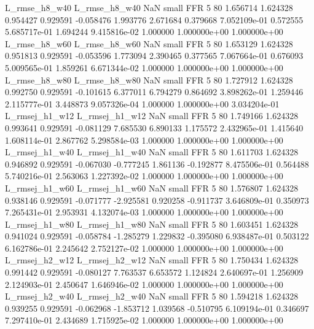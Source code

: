  L_rmse_h8_w40  L_rmse_h8_w40                   NaN      small      FFR                 5 80 1.656714       1.624328 0.954427       0.929591   -0.058476      1.993776      2.671684     0.379668   7.052109e-01  0.572555 5.685717e-01     1.694244   9.415816e-02            1.000000    1.000000e+00        1.000000e+00
 L_rmse_h8_w60  L_rmse_h8_w60                   NaN      small      FFR                 5 80 1.653129       1.624328 0.951813       0.929591   -0.053596      1.773094      2.390465     0.377565   7.067664e-01  0.676093 5.009565e-01     1.859261   6.671344e-02            1.000000    1.000000e+00        1.000000e+00
 L_rmse_h8_w80  L_rmse_h8_w80                   NaN      small      FFR                 5 80 1.727912       1.624328 0.992750       0.929591   -0.101615      6.377011      6.794279     0.864692   3.898262e-01  1.259446 2.115777e-01     3.448873   9.057326e-04            1.000000    1.000000e+00        3.034204e-01
L_rmsej_h1_w12 L_rmsej_h1_w12                   NaN      small      FFR                 5 80 1.749166       1.624328 0.993641       0.929591   -0.081129      7.685530      6.890133     1.175572   2.432965e-01  1.415640 1.608114e-01     2.867762   5.298584e-03            1.000000    1.000000e+00        1.000000e+00
L_rmsej_h1_w40 L_rmsej_h1_w40                   NaN      small      FFR                 5 80 1.611703       1.624328 0.946892       0.929591   -0.067030     -0.777245      1.861136    -0.192877   8.475506e-01  0.564488 5.740216e-01     2.563063   1.227392e-02            1.000000    1.000000e+00        1.000000e+00
L_rmsej_h1_w60 L_rmsej_h1_w60                   NaN      small      FFR                 5 80 1.576807       1.624328 0.938146       0.929591   -0.071777     -2.925581      0.920258    -0.911737   3.646809e-01  0.350973 7.265431e-01     2.953931   4.132074e-03            1.000000    1.000000e+00        1.000000e+00
L_rmsej_h1_w80 L_rmsej_h1_w80                   NaN      small      FFR                 5 80 1.603451       1.624328 0.941024       0.929591   -0.058784     -1.285279      1.229832    -0.395080   6.938487e-01  0.503122 6.162786e-01     2.245642   2.752127e-02            1.000000    1.000000e+00        1.000000e+00
L_rmsej_h2_w12 L_rmsej_h2_w12                   NaN      small      FFR                 5 80 1.750434       1.624328 0.991442       0.929591   -0.080127      7.763537      6.653572     1.124824   2.640697e-01  1.256909 2.124903e-01     2.450647   1.646946e-02            1.000000    1.000000e+00        1.000000e+00
L_rmsej_h2_w40 L_rmsej_h2_w40                   NaN      small      FFR                 5 80 1.594218       1.624328 0.939255       0.929591   -0.062968     -1.853712      1.039568    -0.510795   6.109194e-01  0.346697 7.297410e-01     2.434689   1.715925e-02            1.000000    1.000000e+00        1.000000e+00
